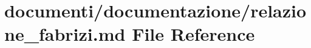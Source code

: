 \hypertarget{relazione__fabrizi_8md}{}\section{documenti/documentazione/relazione\+\_\+fabrizi.md File Reference}
\label{relazione__fabrizi_8md}
